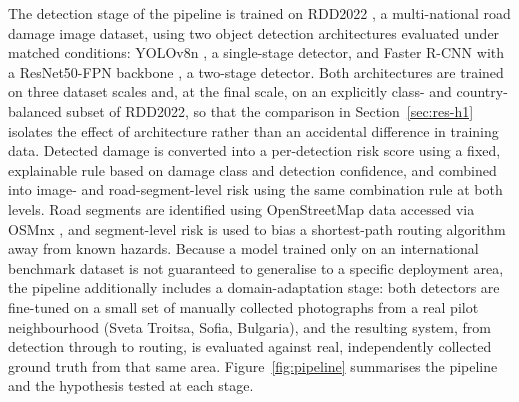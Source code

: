 \documentclass[10pt,a4paper,twocolumn]{article}
\begin{document}
The detection stage of the pipeline is trained on RDD2022
\citep{arya2024rdd2022}, a multi-national road damage image dataset, using
two object detection architectures evaluated under matched conditions:
YOLOv8n \citep{jocher2023ultralytics}, a single-stage detector, and Faster
R-CNN with a ResNet50-FPN backbone \citep{ren2015fasterrcnn}, a two-stage
detector. Both architectures are trained on three dataset scales and, at
the final scale, on an explicitly class- and country-balanced subset of
RDD2022, so that the comparison in Section~\ref{sec:res-h1} isolates the
effect of architecture rather than an accidental difference in training
data. Detected damage is converted into a per-detection risk score using
a fixed, explainable rule based on damage class and detection confidence,
and combined into image- and road-segment-level risk using the same
combination rule at both levels. Road segments are identified using
OpenStreetMap data accessed via OSMnx \citep{boeing2017osmnx}, and
segment-level risk is used to bias a shortest-path routing algorithm away
from known hazards. Because a model trained only on an international
benchmark dataset is not guaranteed to generalise to a specific
deployment area, the pipeline additionally includes a domain-adaptation
stage: both detectors are fine-tuned on a small set of manually collected
photographs from a real pilot neighbourhood (Sveta Troitsa, Sofia,
Bulgaria), and the resulting system, from detection through to routing,
is evaluated against real, independently collected ground truth from that
same area. Figure~\ref{fig:pipeline} summarises the pipeline and the
hypothesis tested at each stage.
\end{document}
